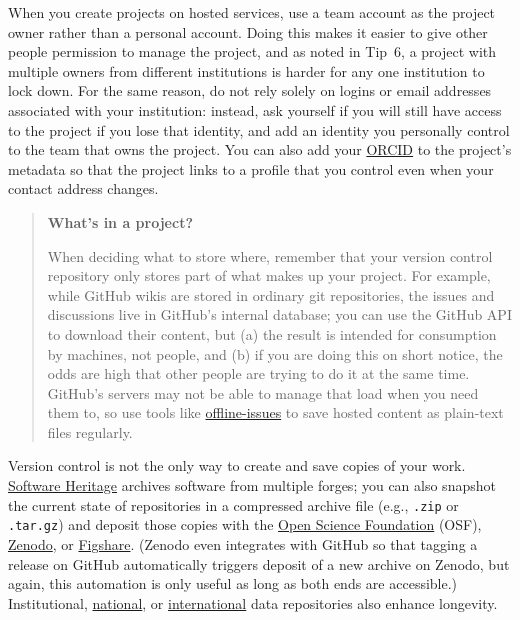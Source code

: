 \documentclass[10pt,letterpaper]{article}
\begin{document}
When you create projects on hosted services,
use a team account as the project owner rather than a personal account.
Doing this makes it easier to give other people permission to manage the project,
and as noted in Tip~6,
a project with multiple owners from different institutions
is harder for any one institution to lock down.
For the same reason,
do not rely solely on logins or email addresses associated with your institution:
instead,
ask yourself if you will still have access to the project if you lose that identity,
and add an identity you personally control to the team that owns the project.
You can also add your \href{https://orcid.org/}{ORCID} to the project's metadata
so that the project links to a profile that you control
even when your contact address changes.

\begin{quote}
  \noindent
  \textbf{What's in a project?}

  When deciding what to store where,
  remember that your version control repository only stores part of what makes up your project.
  For example,
  while GitHub wikis are stored in ordinary git repositories, the issues and discussions live in GitHub's internal database;
  you can use the GitHub API to download their content,
  but (a) the result is intended for consumption by machines, not people,
  and (b) if you are doing this on short notice,
  the odds are high that other people are trying to do it at the same time.
  GitHub's servers may not be able to manage that load when you need them to,
  so use tools like \href{https://github.com/jlord/offline-issues}{offline-issues}
  to save hosted content as plain-text files regularly.
\end{quote}

Version control is not the only way to create and save copies of your work.
\href{https://www.softwareheritage.org/how-to-archive-reference-code/}{Software Heritage} archives software from multiple forges;
you can also snapshot the current state of repositories in a compressed archive file
(e.g., \texttt{.zip} or \texttt{.tar.gz})
and deposit those copies with the \href{https://osf.io/}{Open Science Foundation} (OSF),
\href{https://zenodo.org/}{Zenodo},
or \href{https://figshare.com/}{Figshare}.
(Zenodo even integrates with GitHub so that tagging a release on GitHub
automatically triggers deposit of a new archive on Zenodo,
but again,
this automation is only useful as long as both ends are accessible.)
Institutional,
\href{https://amt.coretrustseal.org/certificates/}{national},
or \href{https://safeguar.de/}{international} data repositories also enhance longevity.
\end{document}
